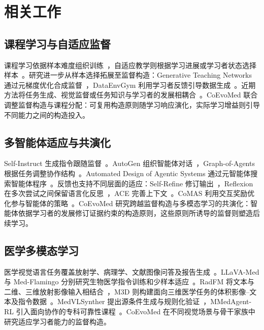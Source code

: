 \section{相关工作}
\label{sec:related}

\subsection{课程学习与自适应监督}

课程学习依据样本难度组织训练~\citep{bengio2009curriculum}，自适应教学则根据学习进展或学习者状态选择样本~\citep{matiisen2017teacher,liu2017iterative}。研究进一步从样本选择拓展至监督构造：Generative Teaching Networks 通过元梯度优化合成监督~\citep{such2020generative}，DataEnvGym 利用学习者反馈引导数据生成~\citep{khan2025dataenvgym}。近期方法将任务生成、视觉监督或任务知识与学习者的发展相耦合~\citep{huang2026rzero,zhang2026viper,wu2026k2}。CoEvoMed 联合调整监督构造与课程分配：可复用构造原则随学习响应演化，实际学习增益则引导不同能力之间的构造投入。

\subsection{多智能体适应与共演化}

Self-Instruct 生成指令跟随监督~\citep{wang2023self}。AutoGen 组织智能体对话~\citep{wu2024autogen}，Graph-of-Agents 根据任务调整协作结构~\citep{yun2026graph}。Automated Design of Agentic Systems 通过元智能体搜索智能体程序~\citep{hu2025automated}。反馈也支持不同层面的适应：Self-Refine 修订输出~\citep{madaan2023selfrefine}，Reflexion 在多次尝试之间保留语言化反思~\citep{shinn2023reflexion}，ACE 完善上下文~\citep{zhang2026agentic}。CoMAS 利用交互奖励优化参与智能体的策略~\citep{xue2026comas}。CoEvoMed 研究跨越监督构造与多模态学习的共演化：智能体依据学习者的发展修订证据约束的构造原则，这些原则所诱导的监督则塑造后续学习。

\subsection{医学多模态学习}

医学视觉语言任务覆盖放射学、病理学、文献图像问答及报告生成~\citep{lau2018dataset,liu2021slake,he2020pathvqa,zhang2024pmc,johnson2019mimic,demnerfushman2016preparing}。LLaVA-Med 与 Med-Flamingo 分别研究生物医学指令训练和少样本适应~\citep{li2023llava,moor2023med}。RadFM 将文本与二维、三维放射影像输入相结合~\citep{wu2025radfm}，M3D 则构建面向三维医学任务的体积影像--文本及指令数据~\citep{bai2024m3d}。MedVLSynther 提出源条件生成与规则化验证~\citep{huang2026synthesizing}，MMedAgent-RL 引入面向协作的专科可靠性课程~\citep{xia2026mmedagent}。CoEvoMed 在不同视觉场景与骨干家族中研究适应学习者能力的监督构造。
